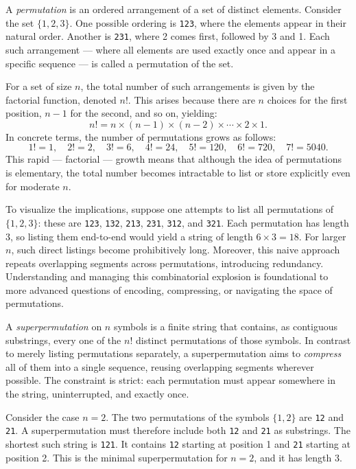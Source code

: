 A \emph{permutation} is an ordered arrangement of a set of distinct elements. Consider the set $\{1, 2, 3\}$. One possible ordering is \texttt{123}, where the elements appear in their natural order. Another is \texttt{231}, where 2 comes first, followed by 3 and 1. Each such arrangement — where all elements are used exactly once and appear in a specific sequence — is called a permutation of the set.

For a set of size $n$, the total number of such arrangements is given by the factorial function, denoted $n!$. This arises because there are $n$ choices for the first position, $n-1$ for the second, and so on, yielding:
\[
n! = n \times (n-1) \times (n-2) \times \cdots \times 2 \times 1.
\]
In concrete terms, the number of permutations grows as follows:
\[
1! = 1,\quad 2! = 2,\quad 3! = 6,\quad 4! = 24,\quad 5! = 120,\quad 6! = 720,\quad 7! = 5040.
\]
This rapid — factorial — growth means that although the idea of permutations is elementary, the total number becomes intractable to list or store explicitly even for moderate $n$.

To visualize the implications, suppose one attempts to list all permutations of $\{1, 2, 3\}$: these are \texttt{123}, \texttt{132}, \texttt{213}, \texttt{231}, \texttt{312}, and \texttt{321}. Each permutation has length 3, so listing them end-to-end would yield a string of length $6 \times 3 = 18$. For larger $n$, such direct listings become prohibitively long. Moreover, this naive approach repeats overlapping segments across permutations, introducing redundancy. Understanding and managing this combinatorial explosion is foundational to more advanced questions of encoding, compressing, or navigating the space of permutations.

A \emph{superpermutation} on $n$ symbols is a finite string that contains, as contiguous substrings, every one of the $n!$ distinct permutations of those symbols. In contrast to merely listing permutations separately, a superpermutation aims to \emph{compress} all of them into a single sequence, reusing overlapping segments wherever possible. The constraint is strict: each permutation must appear somewhere in the string, uninterrupted, and exactly once.

Consider the case $n = 2$. The two permutations of the symbols $\{1, 2\}$ are \texttt{12} and \texttt{21}. A superpermutation must therefore include both \texttt{12} and \texttt{21} as substrings. The shortest such string is \texttt{121}. It contains \texttt{12} starting at position 1 and \texttt{21} starting at position 2. This is the minimal superpermutation for $n = 2$, and it has length 3.

